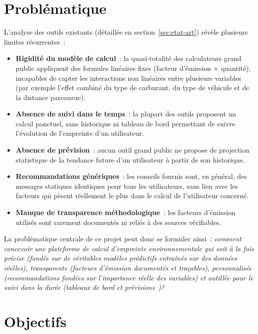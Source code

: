 \section{Problématique}

L'analyse des outils existants (détaillée en section~\ref{sec:etat-art}) révèle plusieurs limites récurrentes~:

\begin{itemize}[label=\textbullet,font=\normalsize]
    \item \textbf{Rigidité du modèle de calcul}~: la quasi-totalité des calculateurs grand public appliquent des formules linéaires fixes (facteur d'émission $\times$ quantité), incapables de capter les interactions non linéaires entre plusieurs variables (par exemple l'effet combiné du type de carburant, du type de véhicule et de la distance parcourue).
    \item \textbf{Absence de suivi dans le temps}~: la plupart des outils proposent un calcul ponctuel, sans historique ni tableau de bord permettant de suivre l'évolution de l'empreinte d'un utilisateur.
    \item \textbf{Absence de prévision}~: aucun outil grand public ne propose de projection statistique de la tendance future d'un utilisateur à partir de son historique.
    \item \textbf{Recommandations génériques}~: les conseils fournis sont, en général, des messages statiques identiques pour tous les utilisateurs, sans lien avec les facteurs qui pèsent réellement le plus dans le calcul de l'utilisateur concerné.
    \item \textbf{Manque de transparence méthodologique}~: les facteurs d'émission utilisés sont rarement documentés ni reliés à des sources vérifiables.
\end{itemize}

La problématique centrale de ce projet peut donc se formuler ainsi~: \emph{comment concevoir une plateforme de calcul d'empreinte environnementale qui soit à la fois précise (fondée sur de véritables modèles prédictifs entraînés sur des données réelles), transparente (facteurs d'émission documentés et traçables), personnalisée (recommandations fondées sur l'importance réelle des variables) et outillée pour le suivi dans la durée (tableaux de bord et prévisions~)?}

\section{Objectifs}

